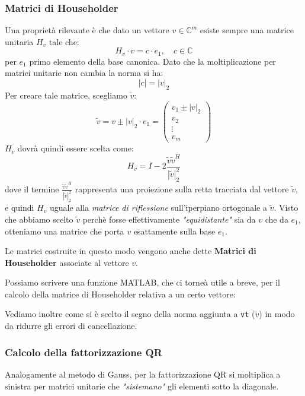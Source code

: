 \documentclass[a4paper,11pt]{article}
\begin{document}
\subsubsection{Matrici di Householder}
Una proprietà rilevante è che dato un vettore $v \in \mathbb{C}^m$ esiste sempre una matrice unitaria $H_v$ tale che:
$$
H_v \cdot v = c \cdot e_1, \quad c \in \mathbb{C}
$$
per $e_1$ primo elemento della base canonica.
Dato che la moltiplicazione per matrici unitarie non cambia la norma si ha:
$$
|c| = |v|_2
$$
Per creare tale matrice, scegliamo $\tilde{v}$:
$$
\tilde{v} = v \pm |v|_2 \cdot e_1 =
\begin{pmatrix}
	v_1 \pm |v|_2 \\ 
	v_2 \\ 
	\vdots \\ 
	v_m
\end{pmatrix}
$$
$H_v$ dovrà quindi essere scelta come:
$$
H_v = I - 2  \frac{\tilde{v} \tilde{v}^H}{|\tilde{v}|_2^2}
$$
dove il termine $\frac{\tilde{v} \tilde{v}^H}{|\tilde{v}|_2^2}$ rappresenta una proiezione sulla retta tracciata dal vettore $\tilde{v}$, e quindi $H_v$ uguale alla \textit{matrice di riflessione} sull'iperpiano ortogonale a $\tilde{v}$.   
Visto che abbiamo scelto $\tilde{v}$ perchè fosse effettivamente \textit{"equidistante"} sia da $v$ che da $e_1$, otteniamo una matrice che porta $v$ esattamente sulla base $e_1$.

Le matrici costruite in questo modo vengono anche dette \textbf{Matrici di Householder} associate al vettore $v$.

Possiamo scrivere una funzione MATLAB, che ci torneà utile a breve, per il calcolo della matrice di Householder relativa a un certo vettore:
\lstset{language=MATLAB,style=codestyle}


Vediamo inoltre come si è scelto il segno della norma aggiunta a \lstinline|vt| ($\tilde{v}$) in modo da ridurre gli errori di cancellazione.

\subsubsection{Calcolo della fattorizzazione QR}
Analogamente al metodo di Gauss, per la fattorizzazione QR si moltiplica a sinistra per matrici unitarie che \textit{"sistemano"} gli elementi sotto la diagonale.
\end{document}
